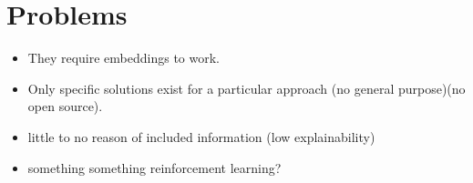 

\section{Problems}\label{sec:moti-problems}
\begin{itemize}
    \item They require embeddings to work.
    \item Only specific solutions exist for a particular approach (no general purpose)(no open source).
    \item little to no reason of included information (low explainability)
    \item something something reinforcement learning?
\end{itemize}

